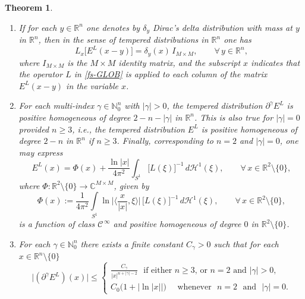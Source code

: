 \documentclass[11pt,reqno]{amsart}
\numberwithin{equation}{section}
\newtheorem{theorem}{Theorem}[section]
\theoremstyle{remark}
\begin{document}
\begin{theorem}
\begin{enumerate}
\vskip 0.08in
\item[(2)] If for each $y\in{\mathbb{R}}^n$ one denotes by $\delta_y$ Dirac's delta distribution
with mass at $y$ in ${\mathbb{R}}^n$, then in the sense of tempered distributions in ${\mathbb{R}}^n$ one has
%
\begin{equation}\label{fs-GLOB}
L_x\big[E^L(x-y)\big]=\delta_y(x)\,I_{M\times M},\qquad\forall\,y\in{\mathbb{R}}^n,
\end{equation}
%
where $I_{M\times M}$ is the $M\times M$ identity matrix, and the subscript $x$ indicates 
that the operator $L$ in \eqref{fs-GLOB} is applied to each column of the matrix $E^L(x-y)$ in the variable $x$.

\vskip 0.08in
\item[(3)] For each multi-index $\gamma\in\mathbb{N}_0^n$ with $|\gamma|>0$, the tempered distribution 
$\partial^\gamma E^L$ is positive homogeneous of degree $2-n-|\gamma|$ in ${\mathbb{R}}^n$.
This is also true for $|\gamma|=0$ provided $n\geq 3$, i.e., the tempered distribution
$E^L$ is positive homogeneous of degree $2-n$ in ${\mathbb{R}}^n$ if $n\geq 3$.
Finally, corresponding to $n=2$ and $|\gamma|=0$, one may express
%
\begin{equation}\label{fs-str}
E^L(x)=\Phi(x)+\frac{\ln|x|}{4\pi^2}\int_{S^{1}}\big[L(\xi)\big]^{-1}\,d{\mathcal{H}}^1(\xi),
\qquad\forall\,x\in\mathbb{R}^2\setminus\{0\},
\end{equation}
%
where $\Phi:\mathbb{R}^2\setminus\{0\}\to{\mathbb{C}}^{M\times M}$, given by 
%
\begin{equation}\label{Def-ES2-Eeda}
\Phi(x):=\frac{1}{4\pi^2}\int\limits_{S^{1}}\ln\Big|\Big\langle\frac{x}{|x|},\xi\Big\rangle\Big|
\,\big[L(\xi)\big]^{-1}\,d{\mathcal{H}}^{1}(\xi),\qquad
\forall\,x\in{\mathbb{R}}^2\setminus\{0\},
\end{equation}
%
is a function of class ${\mathscr{C}}^{\,\infty}$ and positive homogeneous of degree $0$
in ${\mathbb{R}}^2\setminus\{0\}$.

\vskip 0.03in
\item[(4)] For each $\gamma\in\mathbb{N}_0^n$ there exists a finite constant
$C_\gamma>0$ such that for each $x\in{\mathbb{R}}^n\setminus\{0\}$
%
\begin{equation}\label{fs-est}
\big|(\partial^\gamma E^L)(x)\big|\leq
\left\{
\begin{array}{l}
\displaystyle\frac{C_\gamma}{|x|^{n+|\gamma|-2}}
\,\,\text{ if either $n\geq 3$, or $n=2$ and $|\gamma|>0$},
\\[16pt]
C_0\big(1+\big|\ln|x|\big|\big)\quad\text{ whenever }\,\,n=2
\,\,\text{ and }\,\,|\gamma|=0.
\end{array}
\right.
\end{equation}


\end{enumerate}
\end{theorem}
\end{document}

